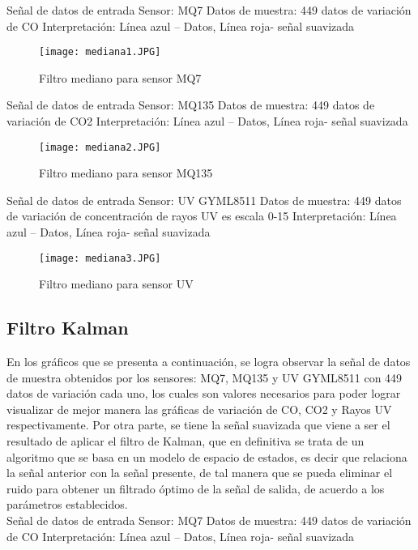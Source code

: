 \documentclass[10pt,a4paper]{article}
\begin{document}
Señal de datos de entrada 
Sensor: MQ7  Datos de muestra: 449 datos de variación de CO
Interpretación:  Línea azul – Datos, Línea roja- señal suavizada 

\begin{figure}[H]
\centering
\texttt{[image: mediana1.JPG]}
 \caption{Filtro mediano para sensor MQ7} 
\end{figure} 

Señal de datos de entrada 
Sensor: MQ135  Datos de muestra: 449 datos de variación de CO2
Interpretación:  Línea azul – Datos, Línea roja- señal suavizada 

\begin{figure}[H]
\centering
\texttt{[image: mediana2.JPG]}
 \caption{Filtro mediano para sensor MQ135} 
\end{figure} 

Señal de datos de entrada 
Sensor: UV GYML8511 		
Datos de muestra: 449 datos de variación de concentración de rayos UV es escala 0-15
Interpretación: Línea azul – Datos, Línea roja- señal suavizada 

\begin{figure}[H]
\centering
\texttt{[image: mediana3.JPG]}
 \caption{Filtro mediano para sensor UV} 
\end{figure} 

\subsection{Filtro Kalman}

En los gráficos que se presenta a continuación, se logra observar la señal de datos de muestra obtenidos por los sensores: MQ7, MQ135 y  UV GYML8511 con 449 datos de variación cada uno, los cuales son valores necesarios para poder lograr visualizar de mejor manera las gráficas de variación de CO, CO2 y Rayos UV respectivamente. Por otra parte, se tiene la señal suavizada que viene a ser el resultado de aplicar el filtro de Kalman, que en definitiva se trata de un algoritmo que se basa en un modelo de espacio de estados, es decir que relaciona la señal anterior con la señal presente, de tal manera que se pueda eliminar el ruido para obtener un  filtrado óptimo de la señal de salida, de acuerdo a los parámetros establecidos. \\

Señal de datos de entrada 
Sensor: MQ7  Datos de muestra: 449 datos de variación de CO
Interpretación: Línea azul – Datos, Línea roja- señal suavizada 
\end{document}
